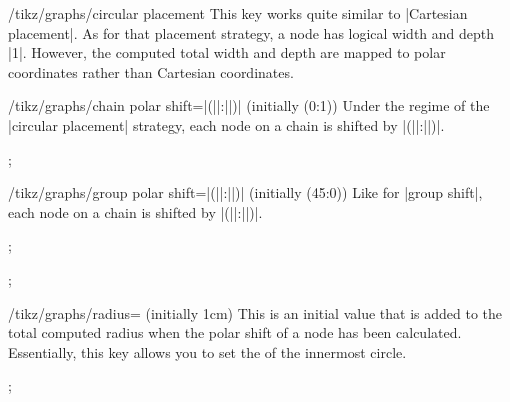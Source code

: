 \begin{key}{/tikz/graphs/circular placement}
    This key works quite similar to |Cartesian placement|. As for that
    placement strategy, a node has logical width and depth |1|. However, the
    computed total width and depth are mapped to polar coordinates rather than
    Cartesian coordinates.

    \begin{key}{/tikz/graphs/chain polar shift=|(||:||)| (initially {(0:1)})}
        Under the regime of the |circular placement| strategy, each node on a
        chain is shifted by
        |(||:||)|.
\begin{codeexample}[preamble={\usetikzlibrary{graphs}}]
\tikz {};
\end{codeexample}
    \end{key}
    \begin{key}{/tikz/graphs/group polar shift=|(||:||)| (initially {(45:0)})}
        Like for |group shift|, each node on a chain is shifted by
        |(||:||)|.
\begin{codeexample}[preamble={\usetikzlibrary{graphs}}]
\tikz {};
\end{codeexample}
\begin{codeexample}[preamble={\usetikzlibrary{graphs}}]
\tikz {};
\end{codeexample}
    \end{key}
    \begin{key}{/tikz/graphs/radius= (initially 1cm)}
        This is an initial value that is added to the total computed radius
        when the polar shift of a node has been calculated. Essentially, this
        key allows you to set the  of the innermost circle.
\begin{codeexample}[preamble={\usetikzlibrary{graphs}}]
\tikz {};
\end{codeexample}
\begin{codeexample}[preamble={\usetikzlibrary{graphs}}]

\end{codeexample}
\end{key}
\end{key}
